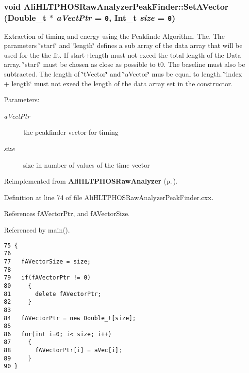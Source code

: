 \subsubsection{\setlength{\rightskip}{0pt plus 5cm}void Ali\-HLTPHOSRaw\-Analyzer\-Peak\-Finder::Set\-AVector (Double\_\-t $\ast$ {\em a\-Vect\-Ptr} = {\tt 0}, Int\_\-t {\em size} = {\tt 0})\hspace{0.3cm}{\tt  [virtual]}}\label{classAliHLTPHOSRawAnalyzerPeakFinder_a5}


Extraction of timing and energy using the Peakfinde Algorithm. The. The parameters \char`\"{}start\char`\"{} and \char`\"{}length\char`\"{} defines a sub array of the data array that will be used for the the fit. If start+length must not exeed the total length of the Data array. \char`\"{}start\char`\"{} must be chosen as close as possible to t0. The baseline must also be subtracted. The length of \char`\"{}t\-Vector\char`\"{} and \char`\"{}a\-Vector\char`\"{} mus be equal to length. \char`\"{}index + length\char`\"{} must not exeed the length of the data array set in the constructor. \begin{Desc}
\item[Parameters:]
\begin{description}
\item[{\em a\-Vect\-Ptr}]the peakfinder vector for timing \item[{\em size}]size in number of values of the time vector \end{description}
\end{Desc}


Reimplemented from {\bf Ali\-HLTPHOSRaw\-Analyzer} {\rm (p.\,\pageref{classAliHLTPHOSRawAnalyzer_a16})}.

Definition at line 74 of file Ali\-HLTPHOSRaw\-Analyzer\-Peak\-Finder.cxx.

References f\-AVector\-Ptr, and f\-AVector\-Size.

Referenced by main().

\footnotesize\begin{verbatim}75 {
76     
77   fAVectorSize = size;
78 
79   if(fAVectorPtr != 0)
80     {
81       delete fAVectorPtr;
82     }
83   
84   fAVectorPtr = new Double_t[size];
85 
86   for(int i=0; i< size; i++)
87     {
88       fAVectorPtr[i] = aVec[i];
89     }
90 }
\end{verbatim}\normalsize 


